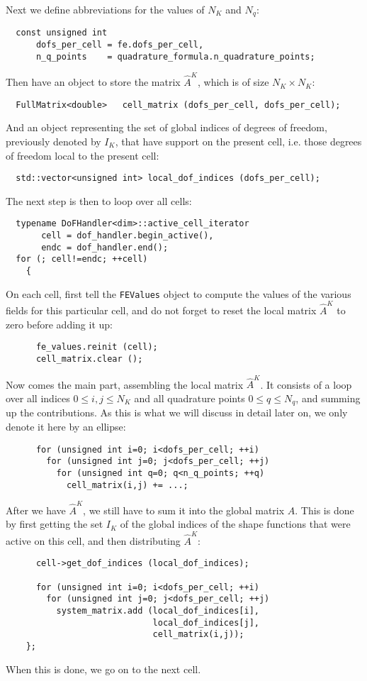 \documentclass{article}
\begin{document}
Next we define abbreviations for the values of $N_K$ and $N_q$:
\begin{verbatim}
  const unsigned int 
      dofs_per_cell = fe.dofs_per_cell,
      n_q_points    = quadrature_formula.n_quadrature_points;
\end{verbatim}
Then have an object to store the matrix $\hat A^K$, which is of size
$N_K\times N_K$:
\begin{verbatim}
  FullMatrix<double>   cell_matrix (dofs_per_cell, dofs_per_cell);
\end{verbatim}
And an object representing the set of global indices of degrees of freedom,
previously denoted by $I_K$, that have support on the present cell, i.e. those
degrees of freedom local to the present cell:
\begin{verbatim}
  std::vector<unsigned int> local_dof_indices (dofs_per_cell);
\end{verbatim}
The next step is then to loop over all cells:
\begin{verbatim}
  typename DoFHandler<dim>::active_cell_iterator
       cell = dof_handler.begin_active(),
       endc = dof_handler.end();
  for (; cell!=endc; ++cell)
    {
\end{verbatim}
On each cell, first tell the \texttt{FEValues} object to compute the values of
the various fields for this particular cell, and do not forget to reset the
local matrix $\hat A^K$ to zero before adding it up:
\begin{verbatim}
      fe_values.reinit (cell);
      cell_matrix.clear ();
\end{verbatim}
Now comes the main part, assembling the local matrix $\hat A^K$. It consists
of a loop over all indices $0\le i,j \le N_K$ and all quadrature points $0\le
q\le N_q$, and summing up the contributions. As this is what we will discuss
in detail later on, we only denote it here by an ellipse:
\begin{verbatim}
      for (unsigned int i=0; i<dofs_per_cell; ++i)
        for (unsigned int j=0; j<dofs_per_cell; ++j)
          for (unsigned int q=0; q<n_q_points; ++q)
            cell_matrix(i,j) += ...;

\end{verbatim}
After we have $\hat A^K$, we still have to sum it into the global matrix
$A$. This is done by first getting the set $I_K$ of the global indices of the
shape functions that were active on this cell, and then distributing $\hat
A^K$: 
\begin{verbatim}
      cell->get_dof_indices (local_dof_indices);

      for (unsigned int i=0; i<dofs_per_cell; ++i)
        for (unsigned int j=0; j<dofs_per_cell; ++j)
          system_matrix.add (local_dof_indices[i],
                             local_dof_indices[j],
                             cell_matrix(i,j));
    };
\end{verbatim}
When this is done, we go on to the next cell.
\end{document}
